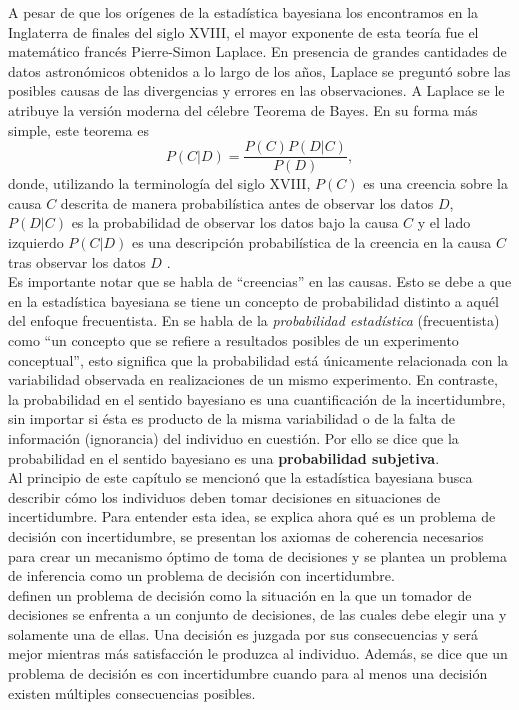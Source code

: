 \documentclass[11pt,a4paper]{article}
\begin{document}
A pesar de que los orígenes de la estadística bayesiana los encontramos en la Inglaterra de finales del siglo XVIII, el mayor exponente de esta teoría fue el matemático francés Pierre-Simon Laplace. En presencia de grandes cantidades de datos astronómicos obtenidos a lo largo de los años, Laplace se preguntó sobre las posibles causas de las divergencias y errores en las observaciones. A Laplace se le atribuye la versión moderna del célebre Teorema de Bayes. En su forma más simple, este teorema es
\begin{equation}
\label{bayes}
P(C|D) = \frac{P(C)P(D|C)}{P(D)},
\end{equation}
donde, utilizando la terminología del siglo XVIII, $P(C)$ es una creencia sobre la causa $C$ descrita de manera probabilística antes de observar los datos $D$, $P(D|C)$ es la probabilidad de observar los datos bajo la causa $C$ y el lado izquierdo $P(C|D)$ es una descripción probabilística de la creencia en la causa $C$ tras observar los datos $D$ \citep{bernardo}.\\

Es importante notar que se habla de ``creencias'' en las causas. Esto se debe a que en la estadística bayesiana se tiene un concepto de probabilidad distinto a aquél del enfoque frecuentista. En \citet{feller} se habla de la \textit{probabilidad estadística} (frecuentista) como ``un concepto que se refiere a resultados posibles de un experimento conceptual'', esto significa que la probabilidad está únicamente relacionada con la variabilidad observada en realizaciones de un mismo experimento. En contraste, la probabilidad en el sentido bayesiano es una cuantificación de la incertidumbre, sin importar si ésta es producto de la misma variabilidad o de la falta de información (ignorancia) del individuo en cuestión. Por ello se dice que la probabilidad en el sentido bayesiano es una \textbf{probabilidad subjetiva}.\\

Al principio de este capítulo se mencionó que la estadística bayesiana busca describir cómo los individuos deben tomar decisiones en situaciones de incertidumbre. Para entender esta idea, se explica ahora qué es un problema de decisión con incertidumbre, se presentan los axiomas de coherencia necesarios para crear un mecanismo óptimo de toma de decisiones y se plantea un problema de inferencia como un problema de decisión con incertidumbre.\\

\citet{mendoza} definen un problema de decisión como la situación en la que un tomador de decisiones se enfrenta a un conjunto de decisiones, 	de las cuales debe elegir una y solamente una de ellas. Una decisión es juzgada por sus consecuencias y será mejor mientras más satisfacción le produzca al individuo. Además, se dice que un problema de decisión es con incertidumbre cuando para al menos una decisión existen múltiples consecuencias posibles.\\
\end{document}

